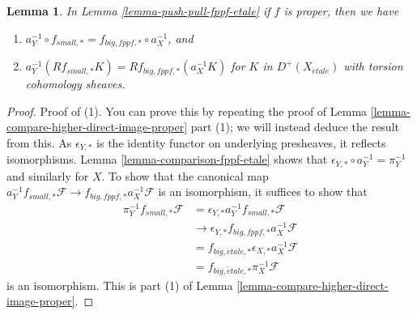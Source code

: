 \documentclass{stacks-project}
\theoremstyle{plain}
\newtheorem{lemma}[subsection]{Lemma}
\theoremstyle{definition}
\theoremstyle{remark}
\numberwithin{equation}{subsection}
\def\etale{{\acute{e}tale}}
\begin{document}
\begin{lemma}
\label{lemma-proper-push-pull-fppf-etale}
In Lemma \ref{lemma-push-pull-fppf-etale} if $f$ is proper, then we have
\begin{enumerate}
\item $a_Y^{-1} \circ f_{small, *} = f_{big, fppf, *} \circ a_X^{-1}$, and
\item
$a_Y^{-1}(Rf_{small, *}K) = Rf_{big, fppf, *}(a_X^{-1}K)$
for $K$ in $D^+(X_\etale)$ with torsion cohomology sheaves.
\end{enumerate}
\end{lemma}

\begin{proof}
Proof of (1). You can prove this by repeating the proof of
Lemma \ref{lemma-compare-higher-direct-image-proper} part (1);
we will instead deduce the result from this.
As $\epsilon_{Y, *}$ is the identity functor on underlying presheaves,
it reflects isomorphisms. Lemma \ref{lemma-comparison-fppf-etale}
shows that $\epsilon_{Y, *} \circ a_Y^{-1} = \pi_Y^{-1}$
and similarly for $X$. To show that the canonical map
$a_Y^{-1}f_{small, *}\mathcal{F} \to f_{big, fppf, *}a_X^{-1}\mathcal{F}$
is an isomorphism, it suffices to show that
\begin{align*}
\pi_Y^{-1}f_{small, *}\mathcal{F}
& =
\epsilon_{Y, *}a_Y^{-1}f_{small, *}\mathcal{F} \\
& \to 
\epsilon_{Y, *}f_{big, fppf, *}a_X^{-1}\mathcal{F} \\
& =
f_{big, \etale, *} \epsilon_{X, *}a_X^{-1}\mathcal{F} \\
& =
f_{big, \etale, *}\pi_X^{-1}\mathcal{F}
\end{align*}
is an isomorphism. This is part
(1) of Lemma \ref{lemma-compare-higher-direct-image-proper}.


\end{proof}
\end{document}
